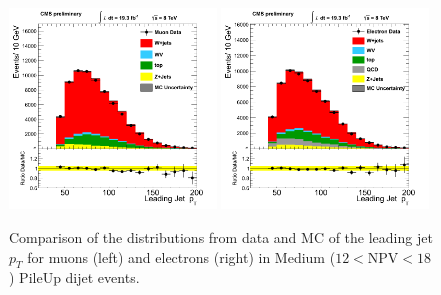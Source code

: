 \begin{figure}[h!t]
  {\centering
    \includegraphics[width=0.49\textwidth]{figs/puchecks/mu_MedNPV_jetld_pt.png}
    \includegraphics[width=0.49\textwidth]{figs/puchecks/el_MedNPV_jetld_pt.png}
    \caption{Comparison of the distributions from data and MC of the
    leading jet $p_T$ for muons (left) and electrons (right)
    in Medium ($12<$NPV$<18$) PileUp dijet events.}
\label{fig:pu_jetldMed}}
\end{figure}
